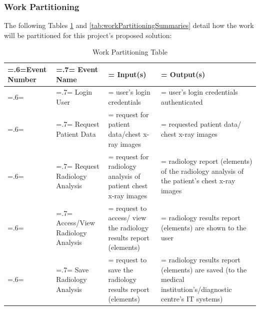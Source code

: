 \documentclass[12pt]{article}
\begin{document}
\subsubsection{Work Partitioning}
The following Tables \ref{tab:workPartitioningEvents} and \ref{tab:workPartitioningSummaries} detail how the work will be partitioned for this project's proposed solution:
\begin{table}[H]
    \centering
    \caption{Work Partitioning Table}
    \label{tab:workPartitioningEvents}
    \begin{tabularx}{\textwidth}{|
    >{\hsize=.6\hsize\linewidth=\hsize}X|>{\hsize=.7\hsize\linewidth=\hsize}X|
    >{\hsize=1.3\hsize\linewidth=\hsize}X|>{\hsize=1.4\hsize\linewidth=\hsize}X|}
        \hline
        \textbf{Event Number} & \textbf{Event Name} & \textbf{Input(s)} & \textbf{Output(s)} \\
        \hline
        1 & Login User & user's login credentials & user's login credentials authenticated \\
        \hline
        2 & Request Patient Data & request for patient data/chest x-ray images & requested patient data/ chest x-ray images \\
        \hline
        3 & Request Radiology Analysis & request for radiology analysis of patient chest x-ray images & radiology report (elements) of the radiology analysis of the patient's chest x-ray images \\
        \hline
        4 & Access/View Radiology Analysis & request to access/ view the radiology results report (elements) & radiology results report (elements) are shown to the user \\
        \hline
        5 & Save Radiology Analysis & request to save the radiology results report (elements) & radiology results report (elements) are saved (to the medical institution's/diagnostic centre's IT systems) \\
        \hline
    \end{tabularx}
\end{table}
\end{document}
